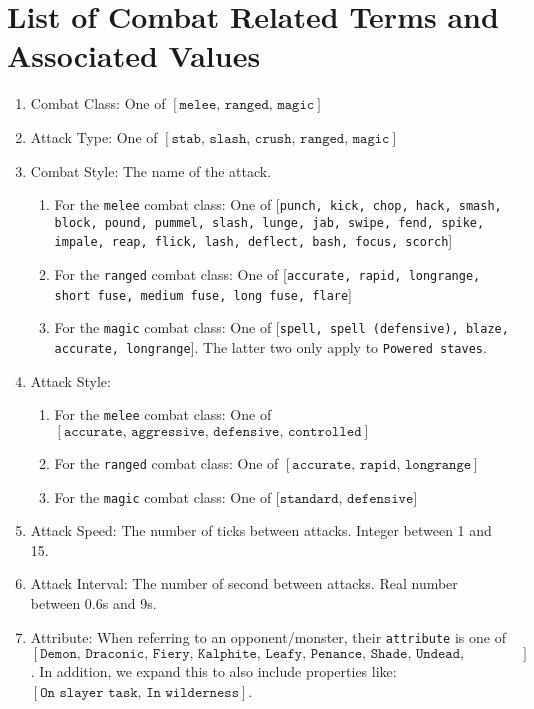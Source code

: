 \section*{List of Combat Related Terms and Associated Values}
	\begin{enumerate}
		\item Combat Class: One of $[\texttt{melee, ranged, magic}]$
		\item Attack Type: One of $[\texttt{stab, slash, crush, ranged, magic}]$
		\item Combat Style: The name of the attack.
			\begin{enumerate}
				\item For the \texttt{melee} combat class: One of [\texttt{punch, kick, chop, hack, smash, block, pound, pummel, slash, lunge, jab, swipe, fend, spike, impale, reap, flick, lash, deflect, bash, focus, scorch}]
				\item For the \texttt{ranged} combat class: One of [\texttt{accurate, rapid, longrange, short fuse, medium fuse, long fuse, flare}]
				\item For the \texttt{magic} combat class: One of [\texttt{spell, spell (defensive), blaze, accurate, longrange}]. The latter two only apply to \texttt{Powered staves}.
			\end{enumerate}
		\item Attack Style:
			\begin{enumerate}
				\item For the \texttt{melee} combat class: One of $[\texttt{accurate, aggressive, defensive, controlled}]$
				\item For the \texttt{ranged} combat class: One of $[\texttt{accurate, rapid, longrange}]$
				\item For the \texttt{magic} combat class: One of [$\texttt{standard, defensive}]$
			\end{enumerate}
		\item Attack Speed: The number of ticks between attacks. Integer between 1 and 15.
		\item Attack Interval: The number of second between attacks. Real number between 0.6s and 9s.
		\item Attribute: When referring to an opponent/monster, their \texttt{attribute} is one of $[\texttt{Demon, Draconic, Fiery, Kalphite, Leafy, Penance, Shade, Undead, Vampyre, Xerician}]$. In addition, we expand this to also include properties like: $[\texttt{On slayer task, In wilderness}]$.
	\end{enumerate}
